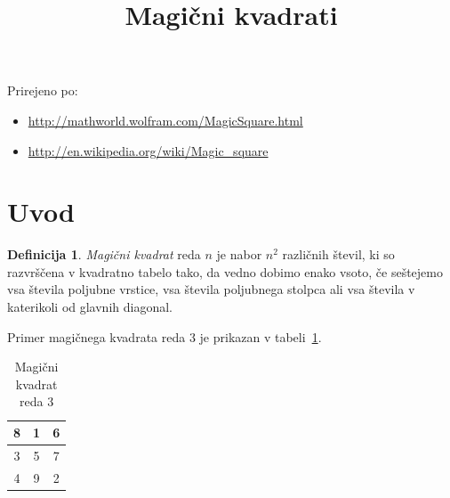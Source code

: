 \documentclass[a4paper,12pt]{article}
\title{Magični kvadrati}\date{}
\theoremstyle{definition}
\newtheorem{definicija}{Definicija}
\theoremstyle{plain}
\begin{document}
\maketitle

Prirejeno po:

\begin{itemize}
   \item \url{http://mathworld.wolfram.com/MagicSquare.html}
   \item \url{http://en.wikipedia.org/wiki/Magic_square}
\end{itemize}

\tableofcontents


\newpage

\section{Uvod}


\begin{definicija}
   \emph{Magični kvadrat} reda \(n\) je nabor \(n^2\) različnih števil,
   ki so razvrščena v kvadratno tabelo tako, da vedno dobimo enako vsoto,
   če seštejemo vsa števila poljubne vrstice, vsa števila poljubnega
   stolpca ali vsa števila v katerikoli od glavnih diagonal.
\end{definicija}

Primer magičnega kvadrata reda 3 je prikazan v tabeli~\ref{table:mag3}.



\begin{table}[!ht]
    \centering
    \caption{Magični kvadrat reda 3}
    \label{table:mag3}

    \begin{tabular}{|c|c|c|}
        \hline
        8 & 1 & 6 \\
        \hline
        3 & 5 & 7 \\
        \hline
        4 & 9 & 2 \\
        \hline
    \end{tabular}
\end{table}
\end{document}
